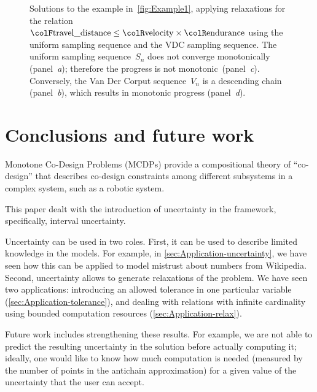 \begin{center}
\begin{figure}[t]
\begin{centering}
{\begin{centering}
                                                                      \par
      \end{centering}
      }
      \par
    \end{centering}
    \caption{Solutions to the example in~\cref{fig:Example1}, applying relaxations
    for the relation ${\colF\text{travel\_distance}}\leq{\colR\text{velocity}}\times{\colR\text{endurance}}$
      using the uniform sampling sequence and the VDC sampling sequence.
      The uniform sampling sequence~$S_{n}$ does not converge monotonically
      (panel~\emph{a}); therefore the progress is not monotonic~(panel\emph{~c}).
      Conversely, the Van Der Corput sequence~$V_{n}$ is a descending
      chain (panel~\emph{b}), which results in monotonic progress (panel~\emph{d}).}
  \end{figure}
  \par
\end{center}

\section{Conclusions and future work}

Monotone Co-Design Problems (MCDPs) provide a compositional theory
of ``co-design'' that describes co-design constraints among different
subsystems in a complex system, such as a robotic system.

This paper dealt with the introduction of uncertainty in the framework,
specifically, interval uncertainty.

Uncertainty can be used in two roles. First, it can be used to describe
limited knowledge in the models. For example, in \cref{sec:Application-uncertainty},
we have seen how this can be applied to model mistrust about numbers
from Wikipedia. Second, uncertainty allows to generate relaxations
of the problem. We have seen two applications: introducing an allowed
tolerance in one particular variable (\cref{sec:Application-tolerance}),
and dealing with relations with infinite cardinality using bounded
computation resources (\cref{sec:Application-relax}).

Future work includes strengthening these results. For example, we
are not able to predict the resulting uncertainty in the solution
before actually computing it; ideally, one would like to know how
much computation is needed (measured by the number of points in the
antichain approximation) for a given value of the uncertainty that
the user can accept.


